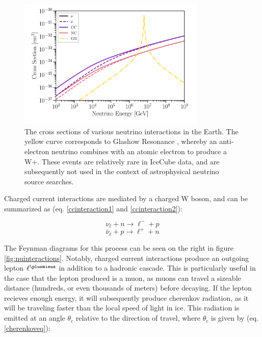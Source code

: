 \begin{figure}[h]
\centering
\includegraphics[width=0.8\textwidth]{figs/nu_cross_sections.png}
\caption{The cross sections of various neutrino interactions in the Earth. The yellow curve corresponds to Glashow Resonance \cite{IceCubeGlashow}, whereby an anti-electron neutrino combines with an atomic electron to produce a W+. These events are relatively rare in IceCube data, and are subsequently not used in the context of astrophysical neutrino source searches.}
\label{fig:cross_sections}
\end{figure}

Charged current interactions are mediated by a charged W boson, and can be summarized as (eq. \ref{ccinteraction1} and \ref{ccinteraction2}):

\begin{equation}
    \nu_\ell +  n \rightarrow \ell^- + p
\label{ccinteraction1}
\end{equation}
\begin{equation}
    \bar{\nu}_\ell +  p \rightarrow \ell^+ + n
\label{ccinteraction2}
\end{equation}

The Feynman diagrams for this process can be seen on the right in figure \ref{fig:nuinteractions}. Notably, charged current interactions produce an outgoing lepton $\ell^\plusminus$ in addition to a hadronic cascade. This is particularly useful in the case that the lepton produced is a muon, as muons can travel a sizeable distance (hundreds, or even thousands of meters) before decaying. If the lepton recieves enough energy, it will subsequently produce cherenkov radiation, as it will be traveling faster than the local speed of light in ice. This radiation is emitted at an angle $\theta_c$ relative to the direction of travel, where $\theta_c$ is given by (eq. \ref{cherenkoveq}):

